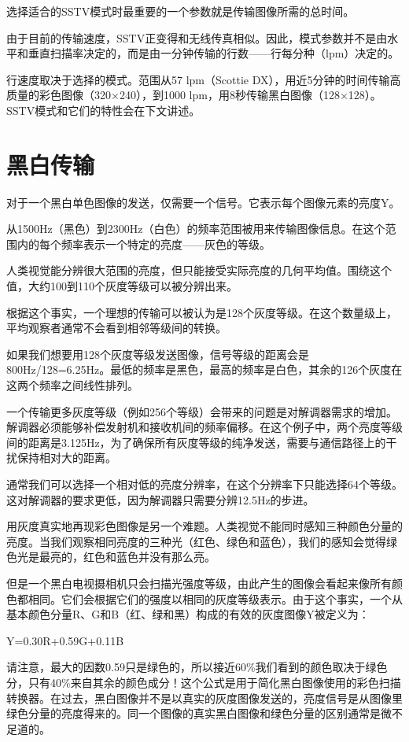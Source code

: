 选择适合的SSTV模式时最重要的一个参数就是传输图像所需的总时间。

由于目前的传输速度，SSTV正变得和无线传真相似。因此，模式参数并不是由水平和垂直扫描率决定的，而是由一分钟传输的行数——行每分种（lpm）决定的。

行速度取决于选择的模式。范围从57 lpm（Scottie DX），用近5分钟的时间传输高质量的彩色图像（320×240），到1000 lpm，用8秒传输黑白图像（128×128）。SSTV模式和它们的特性会在下文讲述。

\section{黑白传输}

对于一个黑白单色图像的发送，仅需要一个信号。它表示每个图像元素的亮度Y。

从1500Hz（黑色）到2300Hz（白色）的频率范围被用来传输图像信息。在这个范围内的每个频率表示一个特定的亮度——灰色的等级。

人类视觉能分辨很大范围的亮度，但只能接受实际亮度的几何平均值。围绕这个值，大约100到110个灰度等级可以被分辨出来。

根据这个事实，一个理想的传输可以被认为是128个灰度等级。在这个数量级上，平均观察者通常不会看到相邻等级间的转换。

如果我们想要用128个灰度等级发送图像，信号等级的距离会是800Hz/128=6.25Hz。最低的频率是黑色，最高的频率是白色，其余的126个灰度在这两个频率之间线性排列。

一个传输更多灰度等级（例如256个等级）会带来的问题是对解调器需求的增加。解调器必须能够补偿发射机和接收机间的频率偏移。在这个例子中，两个亮度等级间的距离是3.125Hz，为了确保所有灰度等级的纯净发送，需要与通信路径上的干扰保持相对大的距离。

通常我们可以选择一个相对低的亮度分辨率，在这个分辨率下只能选择64个等级。这对解调器的要求更低，因为解调器只需要分辨12.5Hz的步进。

用灰度真实地再现彩色图像是另一个难题。人类视觉不能同时感知三种颜色分量的亮度。当我们观察相同亮度的三种光（红色、绿色和蓝色），我们的感知会觉得绿色光是最亮的，红色和蓝色并没有那么亮。

但是一个黑白电视摄相机只会扫描光强度等级，由此产生的图像会看起来像所有颜色都相同。它们会根据它们的强度以相同的灰度等级表示。由于这个事实，一个从基本颜色分量R、G和B（红、绿和黑）构成的有效的灰度图像Y被定义为：

Y=0.30R+0.59G+0.11B

请注意，最大的因数0.59只是绿色的，所以接近60\%我们看到的颜色取决于绿色分，只有40\%来自其余的颜色成分！这个公式是用于简化黑白图像使用的彩色扫描转换器。在过去，黑白图像并不是以真实的灰度图像发送的，亮度信号是从图像里绿色分量的亮度得来的。同一个图像的真实黑白图像和绿色分量的区别通常是微不足道的。

